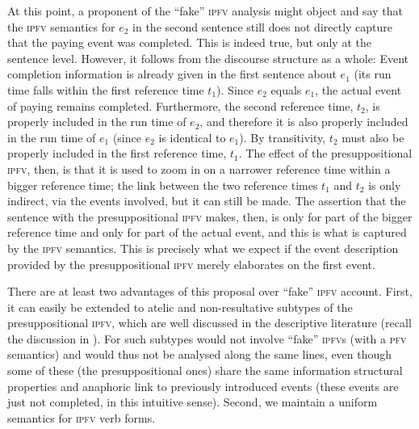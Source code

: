 \documentclass[output=paper]{langscibook}
\begin{document}
At this point, a proponent of the ``fake'' \textsc{ipfv} analysis might object and say that the \textsc{ipfv} semantics for $e_2$ in the second sentence still does not directly capture that the paying event was completed. This is indeed true, but only at the sentence level. However, it follows from the discourse structure as a whole: Event completion information is already given in the first sentence about $e_1$ (its run time falls within the first reference time $t_1$). Since $e_2$ equals $e_1$, the actual event of paying remains completed. Furthermore, the second reference time, $t_2$, is properly included in the run time of $e_2$, and therefore it is also properly included in the run time of $e_1$ (since $e_2$ is identical to $e_1$). By transitivity, $t_2$ must also be properly included in the first reference time, $t_1$. The effect of the presuppositional \textsc{ipfv}, then, is that it is used to zoom in on a narrower reference time within a bigger reference time; the link between the two reference times $t_1$ and $t_2$ is only indirect, via the events involved, but it can still be made. The assertion that the sentence with the presuppositional \textsc{ipfv} makes, then, is only for part of the bigger reference time and only for part of the actual event, and this is what is captured by the \textsc{ipfv} semantics. This is precisely what we expect if the event description provided by the presuppositional \textsc{ipfv} merely elaborates on the first event. 

There are at least two advantages of this proposal over  ``fake'' \textsc{ipfv} account. First, it can easily be extended to atelic and non-resultative subtypes of the presuppositional \textsc{ipfv}, which are well discussed in the descriptive literature (recall the discussion in ). For \citeauthor{gronn15} such subtypes would not involve ``fake'' \textsc{ipfv}s (with a \textsc{pfv} semantics) and would thus not be analysed along the same lines, even though some of these (the presuppositional ones) share the same information structural properties and anaphoric link to previously introduced events (these events are just not completed, in this intuitive sense). Second, we maintain a uniform semantics for \textsc{ipfv} verb forms. 
\end{document}
